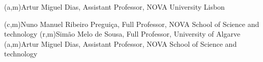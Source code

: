 %
%
%
%
(a,m){Artur Miguel Dias, Assistant Professor, NOVA University Lisbon}



%
%
%
%
(c,m){Nuno Manuel Ribeiro Preguiça, Full Professor, NOVA School of Science and technology}
(r,m){Simão Melo de Sousa, Full Professor, University of Algarve}
(a,m){Artur Miguel Dias, Assistant Professor, NOVA School of Science and technology}
